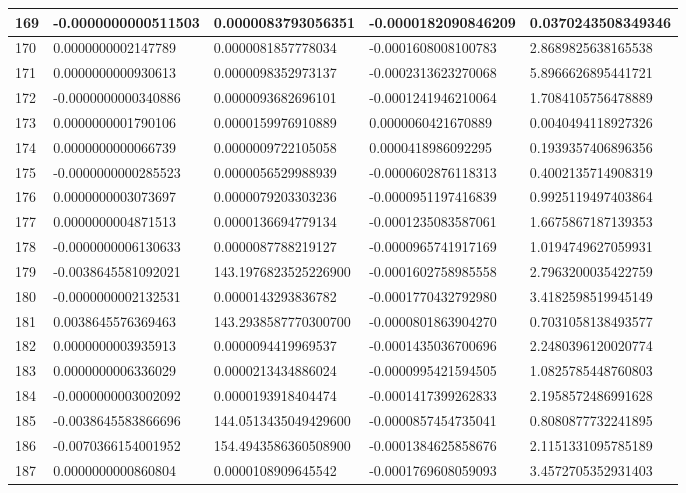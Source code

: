 \begin{center}
\begin{longtable}{|p{0.5cm}|p{3.5cm}|p{3.5cm}|p{3.5cm}|p{3.5cm}|}
\hline
169  & -0.0000000000511503  & 0.0000083793056351  & -0.0000182090846209  & 0.0370243508349346\\
\hline
170  & 0.0000000002147789  & 0.0000081857778034  & -0.0001608008100783  & 2.8689825638165538\\
\hline
171  & 0.0000000000930613  & 0.0000098352973137  & -0.0002313623270068  & 5.8966626895441721\\
\hline
172  & -0.0000000000340886  & 0.0000093682696101  & -0.0001241946210064  & 1.7084105756478889\\
\hline
173  & 0.0000000001790106  & 0.0000159976910889  & 0.0000060421670889  & 0.0040494118927326\\
\hline
174  & 0.0000000000066739  & 0.0000009722105058  & 0.0000418986092295  & 0.1939357406896356\\
\hline
175  & -0.0000000000285523  & 0.0000056529988939  & -0.0000602876118313  & 0.4002135714908319\\
\hline
176  & 0.0000000003073697  & 0.0000079203303236  & -0.0000951197416839  & 0.9925119497403864\\
\hline
177  & 0.0000000004871513  & 0.0000136694779134  & -0.0001235083587061  & 1.6675867187139353\\
\hline
178  & -0.0000000006130633  & 0.0000087788219127  & -0.0000965741917169  & 1.0194749627059931\\
\hline
179  & -0.0038645581092021  & 143.1976823525226900  & -0.0001602758985558  & 2.7963200035422759\\
\hline
180  & -0.0000000002132531  & 0.0000143293836782  & -0.0001770432792980  & 3.4182598519945149\\
\hline
181  & 0.0038645576369463  & 143.2938587770300700  & -0.0000801863904270  & 0.7031058138493577\\
\hline
182  & 0.0000000003935913  & 0.0000094419969537  & -0.0001435036700696  & 2.2480396120020774\\
\hline
183  & 0.0000000006336029  & 0.0000213434886024  & -0.0000995421594505  & 1.0825785448760803\\
\hline
184  & -0.0000000003002092  & 0.0000193918404474  & -0.0001417399262833  & 2.1958572486991628\\
\hline
185  & -0.0038645583866696  & 144.0513435049429600  & -0.0000857454735041  & 0.8080877732241895\\
\hline
186  & -0.0070366154001952  & 154.4943586360508900  & -0.0001384625858676  & 2.1151331095785189\\
\hline
187  & 0.0000000000860804  & 0.0000108909645542  & -0.0001769608059093  & 3.4572705352931403\\

\end{longtable}
\end{center}
